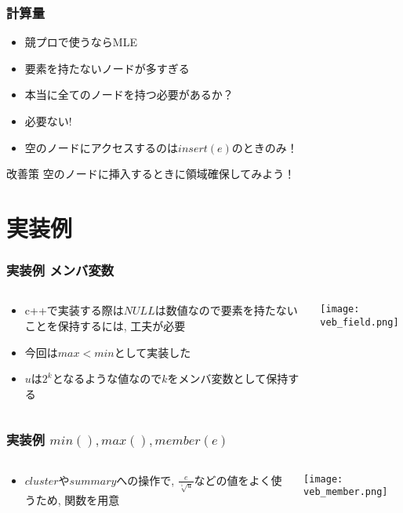 \documentclass[dvipdfmx,12pt,notheorems]{beamer}
\theoremstyle{definition}
\begin{document}
\begin{frame}\frametitle{計算量}
\begin{itemize}
\item 競プロで使うならMLE
\item 要素を持たないノードが多すぎる
\item 本当に全てのノードを持つ必要があるか？
\pause
\item \large{必要ない!}
\item 空のノードにアクセスするのは$insert(e)$のときのみ！
\end{itemize}
\begin{block}{改善策}
空のノードに挿入するときに領域確保してみよう！
\end{block}
\end{frame}

\section{実装例}
\begin{frame}\frametitle{実装例\; メンバ変数}
\begin{columns}
\begin{column}{0.39\textwidth}
\begin{itemize}
\item c++で実装する際は$NULL$は数値なので要素を持たないことを保持するには, 工夫が必要
\item 今回は$max < min$として実装した
\item $u$は$2^k$となるような値なので$k$をメンバ変数として保持する
\end{itemize}
\end{column}
\begin{column}{0.6\textwidth}
\texttt{[image: veb\_field.png]}
\end{column}
\end{columns}
\end{frame}

\begin{frame}\frametitle{実装例\; $min(), max(), member(e)$}
\begin{columns}
\begin{column}{0.39\textwidth}
\begin{itemize}
\item $cluster$や$summary$への操作で, $\frac{e}{\sqrt[\downarrow]{u}}$などの値をよく使うため, 関数を用意
\end{itemize}
\end{column}
\begin{column}{0.6\textwidth}
\texttt{[image: veb\_member.png]}
\end{column}
\end{columns}
\end{frame}
\end{document}

